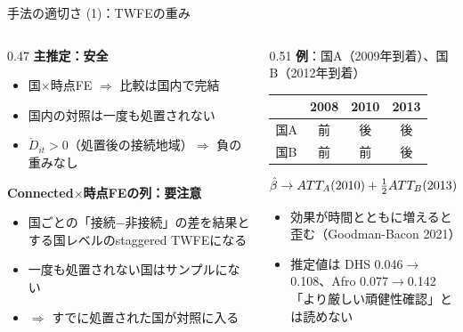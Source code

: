 \documentclass[aspectratio=169,11pt]{beamer}
\begin{document}
\begin{frame}{手法の適切さ (1)：TWFEの重み}
  \begin{columns}[T]
    \begin{column}{0.47\textwidth}
      \textbf{主推定：安全}
      \begin{itemize}\small
        \item 国$\times$時点FE $\Rightarrow$ 比較は国内で完結
        \item 国内の対照は一度も処置されない
        \item $\dot D_{it} > 0$（処置後の接続地域）$\Rightarrow$ 負の重みなし
      \end{itemize}
      \vspace{0.4em}
      \textbf{Connected$\times$時点FEの列：要注意}
      \begin{itemize}\small
        \item 国ごとの「接続$-$非接続」の差を結果とする\alert{国レベルのstaggered TWFE}になる
        \item 一度も処置されない国はサンプルにない
        \item $\Rightarrow$ \alert{すでに処置された国}が対照に入る
      \end{itemize}
    \end{column}
    \begin{column}{0.51\textwidth}
      \small
      \textbf{例}：国A（2009年到着）、国B（2012年到着）\\[0.2em]
      \begin{tabular}{lccc}
        \toprule
        & 2008 & 2010 & 2013 \\
        \midrule
        国A & 前 & 後 & 後 \\
        国B & 前 & 前 & 後 \\
        \bottomrule
      \end{tabular}
      \[
        \textstyle\hat\beta \to ATT_A(2010) + \tfrac12 ATT_B(2013) - \tfrac12\,\alert{ATT_A(2013)}
      \]
      \begin{itemize}
        \item 効果が時間とともに増えると歪む（Goodman-Bacon 2021）
        \item 推定値は DHS 0.046$\to$0.108、Afro 0.077$\to$0.142\\\alert{「より厳しい頑健性確認」とは読めない}
      \end{itemize}
    \end{column}
  \end{columns}
\end{frame}
\end{document}
